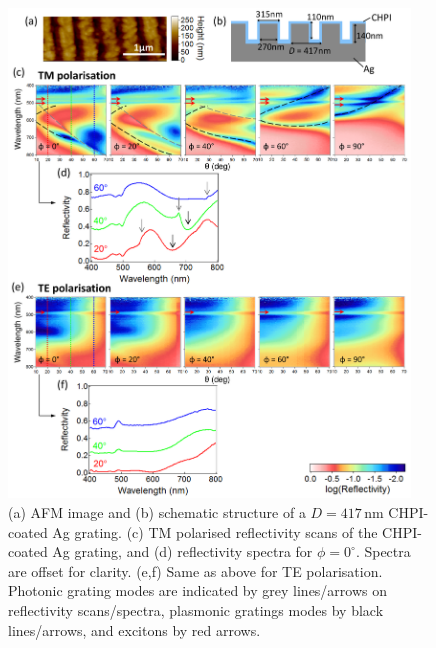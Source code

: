 \begin{figure}[h!] 
\centering    
\includegraphics[width=0.95\textwidth]{Fig17}
\caption[(a) AFM image and (b) schematic structure of $D=417$\,nm CHPI-coated Ag grating. Reflectivity measurements of CHPI-coated Ag grating in (c,d) TM and (e.f) TE polarisation.]{(a) AFM image and (b) schematic structure of a $D=417$\,nm CHPI-coated Ag grating. (c) TM polarised reflectivity scans of the CHPI-coated Ag grating, and (d) reflectivity spectra for $\phi=0^{\circ}$. Spectra are offset for clarity. (e,f) Same as above for TE polarisation. Photonic grating modes are indicated by grey lines/arrows on reflectivity scans/spectra, plasmonic gratings modes by black lines/arrows, and excitons by red arrows.}
\label{7Fig17}
\end{figure}


